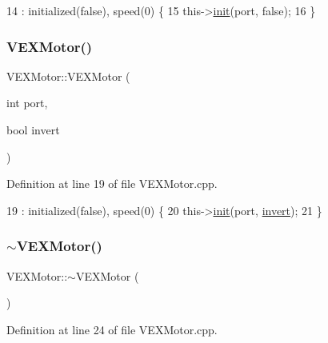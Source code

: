 \begin{DoxyCode}
14                            : initialized(\textcolor{keyword}{false}), speed(0)  \{
15     this->\hyperlink{class_v_e_x_motor_a67dc328fafe4cd889b40a1147a0d4326}{init}(port, \textcolor{keyword}{false});
16 \}
\end{DoxyCode}
\mbox{\label{class_v_e_x_motor_a7de15da93ffb3034b3dc34d106b68ac6}} 
\subsubsection{\texorpdfstring{V\+E\+X\+Motor()}{VEXMotor()}\hspace{0.1cm}{\footnotesize\ttfamily [3/3]}}
{\footnotesize\ttfamily V\+E\+X\+Motor\+::\+V\+E\+X\+Motor (\begin{DoxyParamCaption}\item[{int}]{port,  }\item[{bool}]{invert }\end{DoxyParamCaption})}



Definition at line 19 of file V\+E\+X\+Motor.\+cpp.


\begin{DoxyCode}
19                                         : initialized(\textcolor{keyword}{false}), speed(0)  \{
20     this->\hyperlink{class_v_e_x_motor_a67dc328fafe4cd889b40a1147a0d4326}{init}(port, \hyperlink{class_v_e_x_motor_a2c4c51b0b9c1c6747e0a8f1cee9f39e3}{invert});
21 \}
\end{DoxyCode}
\mbox{\label{class_v_e_x_motor_a1f0c73e1feb9f1bbe6bcc1216e8de430}} 
\subsubsection{\texorpdfstring{$\sim$\+V\+E\+X\+Motor()}{~VEXMotor()}}
{\footnotesize\ttfamily V\+E\+X\+Motor\+::$\sim$\+V\+E\+X\+Motor (\begin{DoxyParamCaption}{ }\end{DoxyParamCaption})}



Definition at line 24 of file V\+E\+X\+Motor.\+cpp.


